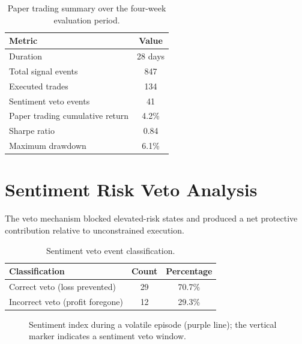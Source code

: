 \begin{table}[ht]
\centering
\caption{Paper trading summary over the four-week evaluation period.}
\label{ch5:tab3}
\begin{tabular}{@{}lc@{}}
\toprule
\textbf{Metric} & \textbf{Value} \\
\midrule
Duration & 28 days \\
Total signal events & 847 \\
Executed trades & 134 \\
Sentiment veto events & 41 \\
Paper trading cumulative return & 4.2\% \\
Sharpe ratio & 0.84 \\
Maximum drawdown & 6.1\% \\
\bottomrule
\end{tabular}
\end{table}

\section{Sentiment Risk Veto Analysis}
The veto mechanism blocked elevated-risk states and produced a net protective contribution relative to unconstrained execution.

\begin{table}[ht]
\centering
\caption{Sentiment veto event classification.}
\label{ch5:tab4}
\begin{tabular}{@{}lcc@{}}
\toprule
\textbf{Classification} & \textbf{Count} & \textbf{Percentage} \\
\midrule
Correct veto (loss prevented) & 29 & 70.7\% \\
Incorrect veto (profit foregone) & 12 & 29.3\% \\
\bottomrule
\end{tabular}
\end{table}

\begin{figure}[ht]
\centering
{}
\caption{Sentiment index during a volatile episode (purple line); the vertical marker indicates a sentiment veto window.}
\label{ch5:fig3}
\end{figure}


